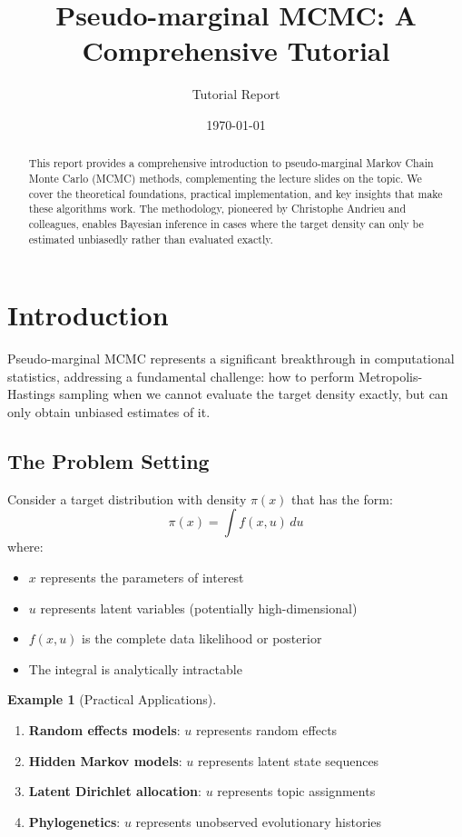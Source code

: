 \documentclass[11pt]{article}
\title{Pseudo-marginal MCMC: A Comprehensive Tutorial}
\author{Tutorial Report}
\date{\today}
\theoremstyle{definition}
\newtheorem{example}{Example}
\begin{document}
\maketitle

\begin{abstract}
This report provides a comprehensive introduction to pseudo-marginal Markov Chain Monte Carlo (MCMC) methods, complementing the lecture slides on the topic. We cover the theoretical foundations, practical implementation, and key insights that make these algorithms work. The methodology, pioneered by Christophe Andrieu and colleagues, enables Bayesian inference in cases where the target density can only be estimated unbiasedly rather than evaluated exactly.
\end{abstract}

\section{Introduction}

Pseudo-marginal MCMC represents a significant breakthrough in computational statistics, addressing a fundamental challenge: how to perform Metropolis-Hastings sampling when we cannot evaluate the target density exactly, but can only obtain unbiased estimates of it.

\subsection{The Problem Setting}

Consider a target distribution with density $\pi(x)$ that has the form:
\begin{equation}
\pi(x) = \int f(x,u) \, du
\end{equation}
where:
\begin{itemize}
\item $x$ represents the parameters of interest
\item $u$ represents latent variables (potentially high-dimensional)
\item $f(x,u)$ is the complete data likelihood or posterior
\item The integral is analytically intractable
\end{itemize}

\begin{example}[Practical Applications]
\begin{enumerate}
\item \textbf{Random effects models}: $u$ represents random effects
\item \textbf{Hidden Markov models}: $u$ represents latent state sequences
\item \textbf{Latent Dirichlet allocation}: $u$ represents topic assignments
\item \textbf{Phylogenetics}: $u$ represents unobserved evolutionary histories
\end{enumerate}
\end{example}
\end{document}

